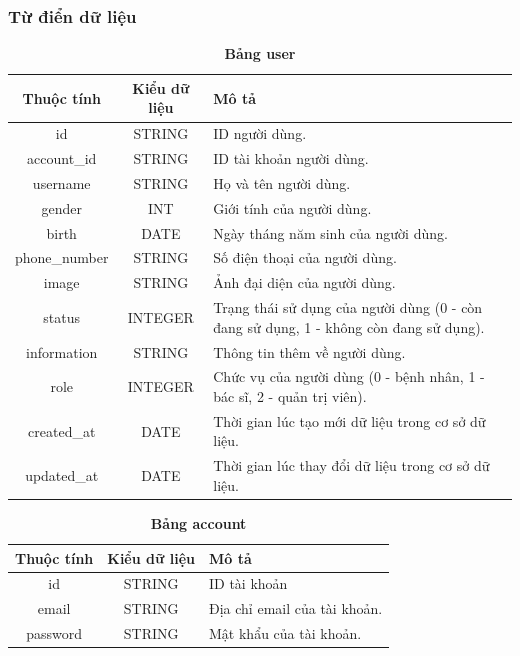 \subsubsection{Từ điển dữ liệu}

\begin{table}[H]
  \caption{\bfseries \fontsize{12pt}{0pt}\selectfont Bảng user}
  \centering
  \begin{tabularx}{\textwidth}{|c|c|X|}
    \hline
    \textbf{Thuộc tính} & \textbf{Kiểu dữ liệu} & \textbf{Mô tả} \\
    \hline
    id & STRING & ID người dùng.  \\
    \hline
    account\_id & STRING & ID tài khoản người dùng. \\
    \hline
    username & STRING & Họ và tên người dùng. \\
    \hline
    gender & INT & Giới tính của người dùng. \\
    \hline
    birth & DATE & Ngày tháng năm sinh của người dùng. \\
    \hline
    phone\_number & STRING & Số điện thoại của người dùng. \\
    \hline
    image & STRING & Ảnh đại diện của người dùng. \\
    \hline
    status & INTEGER & Trạng thái sử dụng của người dùng (0 - còn đang sử dụng, 1 - không còn đang sử dụng). \\
    \hline
    information & STRING & Thông tin thêm về người dùng. \\
    \hline
    role & INTEGER & Chức vụ của người dùng (0 - bệnh nhân, 1 - bác sĩ, 2 - quản trị viên). \\
    \hline
    created\_at & DATE & Thời gian lúc tạo mới dữ liệu trong cơ sở dữ liệu. \\
    \hline
    updated\_at & DATE & Thời gian lúc thay đổi dữ liệu trong cơ sở dữ liệu. \\
    \hline
    
  \end{tabularx}
\end{table}


\begin{table}[H]
  \caption{\bfseries \fontsize{12pt}{0pt}\selectfont Bảng account}
  \centering
  \begin{tabularx}{\textwidth}{|c|c|X|}
    \hline
    \textbf{Thuộc tính} & \textbf{Kiểu dữ liệu} & \textbf{Mô tả} \\
    \hline
    id & STRING & ID tài khoản  \\
    \hline
    email & STRING & Địa chỉ email của tài khoản. \\
    \hline
    password & STRING & Mật khẩu của tài khoản. \\
    \hline
  \end{tabularx}
\end{table}

